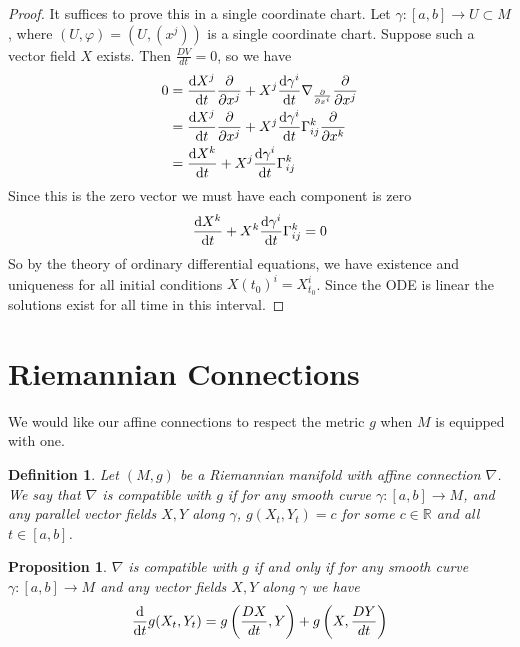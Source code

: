 \documentclass[a4paper]{article}
\newtheorem*{prop}{Proposition}
\newtheorem*{defn}{Definition}
\begin{document}
\begin{proof}
  It suffices to prove this in a single coordinate chart. Let $\gamma: [a,b] \rightarrow U \subset M$, where $(U, \varphi) = (U, (x^j))$ is a single coordinate chart. Suppose such a vector field $X$ exists. Then $\frac{DV}{dt} = 0$, so we have
  \[
    \begin{aligned}
      0 &= \dv{X^j}{t} \pdv{x^j} + X^j \dv{\gamma^i}{t} \nabla_{\pdv{x^i}} \pdv{x^j} \\
        &= \dv{X^j}{t} \pdv{x^j} + X^j \dv{\gamma^i}{t} \Gamma_{ij}^k \pdv{x^k} \\
        &= \dv{X^k}{t} + X^j \dv{\gamma^i}{t} \Gamma_{ij}^k \\
    \end{aligned}
  \]
  Since this is the zero vector we must have each component is zero
  \[
    \dv{X^k}{t} + X^k \dv{\gamma^i}{t} \Gamma_{ij}^k = 0
  \]
  So by the theory of ordinary differential equations, we have existence and uniqueness for all initial conditions $X(t_0)^i = X^i_{t_0}$. Since the ODE is linear the solutions exist for all time in this interval.
\end{proof}

\section*{Riemannian Connections}%
We would like our affine connections to respect the metric $g$ when $M$ is equipped with one. 

\begin{defn}
  Let $(M,g)$ be a Riemannian manifold with affine connection $\nabla$. We say that $\nabla$ is compatible with $g$ if for any smooth curve $\gamma: [a,b] \rightarrow M$, and any parallel vector fields $X,Y$ along $\gamma$, $g(X_t,Y_t) = c$ for some $c \in \mathds{R}$ and all $t \in [a,b]$. 
\end{defn}

\begin{prop}
  $\nabla$ is compatible with $g$ if and only if for any smooth curve $\gamma: [a,b] \rightarrow M$ and any vector fields $X,Y$ along $\gamma$ we have 
  \[
    \dv{t} g(X_t, Y_t)  = g \left( \frac{DX}{dt}, Y \right) + g \left( X, \frac{DY}{dt} \right)
  \]
\end{prop}
\end{document}
